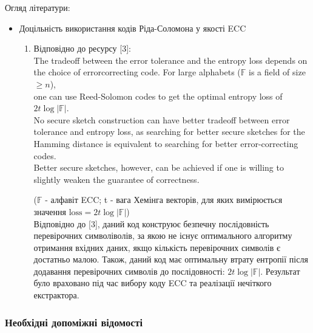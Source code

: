 \documentclass[11pt]{article}
\providecommand{\tightlist}{%
      \setlength{\itemsep}{0pt}\setlength{\parskip}{0pt}}
\begin{document}
Огляд літератури:

\begin{itemize}
\tightlist
\item
  Доцільність використання кодів Ріда-Соломона у якості ECC

  \begin{enumerate}
  \def\labelenumi{\arabic{enumi}.}
  \item
    Відповідно до ресурсу [3]:\\
    The tradeoff between the error tolerance and the
    entropy loss depends on the choice of errorcorrecting code. For
    large alphabets (\(\mathbb{F}\) is a field of size \(\geq n\)),\\
    one can use Reed-Solomon codes to get the optimal
    entropy loss of \(2t\log{|\mathbb{F}|}\). \\
    No secure sketch construction can have better tradeoff between error tolerance
    and entropy loss, as searching for better secure sketches for the Hamming distance is equivalent to searching for
    better error-correcting codes. \\
    Better secure sketches, however, can be achieved if one is willing to\\
    slightly weaken the guarantee of correctness.

    (\(\mathbb{F}\) - алфавіт ECC; t - вага Хемінга векторів, для
    яких вимірюється значення \(\text{loss} = 2t\log{|\mathbb{F}|}\))\\

    Відповідно до [3], даний код конструює безпечну послідовність
    перевірочних символіволів, за якою не існує оптимального алгоритму
    отримання вхідних даних, якщо кількість перевірочних символів є достатньо малою. Також, даний код має оптимальну втрату
    ентропії після додавання перевірочних символів до послідовності:
    \(2t\log{|\mathbb{F}|}\). Результат було враховано під час вибору
    коду ECC та реалізації нечіткого екстрактора.
  \end{enumerate}
\end{itemize}

    \hypertarget{ux43dux435ux43eux431ux445ux456ux434ux43dux456-ux434ux43eux43fux43eux43cux456ux436ux43dux456-ux432ux456ux434ux43eux43cux43eux441ux442ux456}{%
\subsubsection{Необхідні допоміжні
відомості}\label{ux43dux435ux43eux431ux445ux456ux434ux43dux456-ux434ux43eux43fux43eux43cux456ux436ux43dux456-ux432ux456ux434ux43eux43cux43eux441ux442ux456}}
\end{document}
